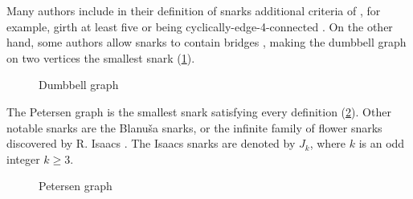 Many authors include in their definition of snarks additional criteria of , for example, girth at least five or being cyclically-edge-4-connected \cite{Preissmann1983, Nedela1996}. On the other hand, some authors allow snarks to contain bridges \cite{IrreducibleSnarksSkoviera}, making the dumbbell graph on two vertices the smallest snark (\cref{fig:dumbbell}).

\begin{figure}
	\centering
	
	\caption{Dumbbell graph}
	\label{fig:dumbbell}
\end{figure}

The Petersen graph is the smallest snark satisfying every definition (\cref{fig:petersen}). Other notable snarks are the Blanuša snarks, or the infinite family of flower snarks discovered by R. Isaacs \cite{Isaacs1975}. The Isaacs snarks are denoted by $J_k$, where $k$ is an odd integer $k\geq 3$.

\begin{figure}
	\centering
	
	\caption{Petersen graph}
	\label{fig:petersen}
\end{figure}